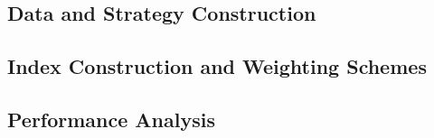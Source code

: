
\subsection{Data and Strategy Construction}
\label{sec:data_strategies}


\subsection{Index Construction and Weighting Schemes}
\label{sec:index_construction}


\subsection{Performance Analysis}
\label{sec:performance}

